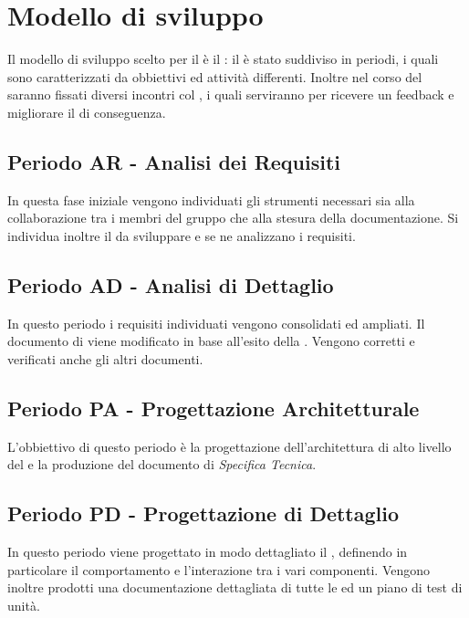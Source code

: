 \documentclass[./PianoDiProgetto.tex]{subfiles}
\begin{document}
  \section{Modello di sviluppo}

  Il modello di sviluppo scelto per il  è il : il
   è stato suddiviso in periodi, i quali sono caratterizzati da
  obbiettivi ed attività differenti. Inoltre nel corso del  saranno
  fissati diversi incontri col , i quali serviranno per ricevere un
  feedback e migliorare il  di conseguenza.

  \subsection{Periodo AR - Analisi dei Requisiti}

  In questa fase iniziale vengono individuati gli strumenti necessari sia alla
  collaborazione tra i membri del gruppo che alla stesura della documentazione.
  Si individua inoltre il  da sviluppare e se ne analizzano i requisiti.

  \subsection{Periodo AD - Analisi di Dettaglio}

  In questo periodo i requisiti individuati vengono consolidati ed ampliati. Il
  documento di \ARdoc viene modificato in base all'esito
  della \RR. Vengono corretti e verificati anche gli altri documenti.

  \subsection{Periodo PA - Progettazione Architetturale}

  L'obbiettivo di questo periodo è la progettazione dell'architettura di alto
  livello del  e la produzione del documento di \textit{Specifica Tecnica}.

  \subsection{Periodo PD - Progettazione di Dettaglio}

  In questo periodo viene progettato in modo dettagliato il , definendo
  in particolare il comportamento e l'interazione tra i vari componenti. Vengono
  inoltre prodotti una documentazione dettagliata di tutte le  ed un piano
  di test di unità.
\end{document}
